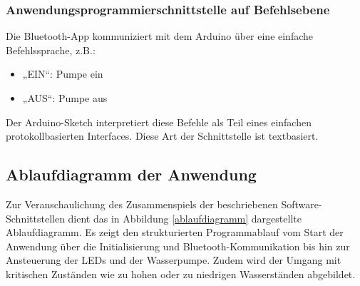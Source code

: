 \subsubsection{Anwendungsprogrammierschnittstelle auf Befehlsebene}
Die Bluetooth-App kommuniziert mit dem Arduino über eine einfache Befehlssprache, z.B.:
\begin{itemize}
	\item „EIN“: Pumpe ein
	\item „AUS“: Pumpe aus
\end{itemize}
Der Arduino-Sketch interpretiert diese Befehle als Teil eines einfachen protokollbasierten Interfaces. Diese Art der Schnittstelle ist textbasiert.

\subsection{Ablaufdiagramm der Anwendung}
Zur Veranschaulichung des Zusammenspiels der beschriebenen Software-Schnittstellen dient das in Abbildung \ref{ablaufdiagramm} dargestellte Ablaufdiagramm. Es zeigt den strukturierten Programmablauf vom Start der Anwendung über die Initialisierung und Bluetooth-Kommunikation bis hin zur Ansteuerung der LEDs und der Wasserpumpe. Zudem wird der Umgang mit kritischen Zuständen wie zu hohen oder zu niedrigen Wasserständen abgebildet. 

